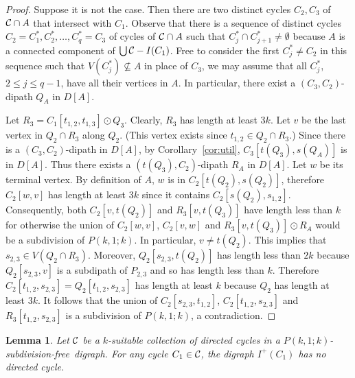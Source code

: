 \documentclass[utf8,10pt]{article}
\theoremstyle{plain}
\newtheorem{lemma}[theorem]{Lemma}
\theoremstyle{definition}
\theoremstyle{remark}
\newcommand{\FH}[1]{{\color{red}{\bf Fred:} #1}}
\newcommand{\free}{subdivision-free}
\begin{document}
\begin{proof}
Suppose it is not the case. Then there are two distinct cycles $C_2, C_3$ of ${\cal C}\cap A$ that intersect with $C_1$.
Observe that there is a sequence of distinct cycles $C_2=C^*_1, C^*_2, \dots , C^*_q=C_3$ of cycles of ${\cal C}\cap A$ such that $C^*_j\cap C^*_{j+1}\neq \emptyset$ because $A$ is a connected component of $\bigcup{\cal C} - I(C_1)$.
Free to consider the first $C^*_j \neq C_2$ in this sequence such that $V(C^*_j)\not\subseteq A$ in place of $C_3$, we may assume
 that all $C^*_j$, $2\leq j\leq q-1$, have all their vertices in $A$.
 In particular, there exist a  $(C_3,C_2)$-dipath $Q_A$ in $D[A]$.

Let $R_3=C_1[t_{1,2},t_{1,3}]\odot Q_3$. Clearly, $R_3$ has length at least $3k$.
Let $v$ be the last vertex in $Q_2\cap R_3$ along $Q_2$. (This vertex exists since $t_{1,2}\in Q_2\cap R_3$.) Since there is a $(C_3,C_2)$-dipath in $D[A]$, by Corollary~\ref{cor:util}, $C_3[t(Q_3), s(Q_A)]$ is in $D[A]$. Thus  there exists a $(t(Q_3), C_2)$-dipath $R_A$ in $D[A]$.  Let $w$ be its terminal vertex. By definition of $A$, $w$ is in $C_2[t(Q_2), s(Q_2)]$, therefore $C_2[w,v]$ has length at least $3k$ since it contains $C_2[s(Q_2), s_{1,2}]$. Consequently, both $C_2[v,t(Q_2)]$ and $R_3[v,t(Q_3)]$ have length less than $k$ for otherwise the union of $C_2[w,v]$, $C_2[v,w]$ and $R_3[v,t(Q_3)]\odot R_A$ would be a subdivision of $P(k,1;k)$.
In particular, $v\neq t(Q_2)$. This implies that $s_{2,3}\in V(Q_2\cap R_3)$.
Moreover, $Q_2[s_{2,3}, t(Q_2)]$ has length less than $2k$ because $Q_2[s_{2,3},v]$ is a subdipath of $P_{2,3}$ and so has length less than $k$.
Therefore $C_2[t_{1,2},s_{2,3}]=Q_2[t_{1,2},s_{2,3}]$ has length at least $k$ because $Q_2$ has length at least $3k$.
It follows that the union of $C_2[s_{2,3},t_{1,2}]$,  $C_2[t_{1,2},s_{2,3}]$ and  $R_3[t_{1,2},s_{2,3}]$ is a subdivision of $P(k,1;k)$, a contradiction.
\end{proof}



\begin{lemma}\label{lem:no-dicycle}
Let ${\cal C}$ be a $k$-suitable collection of directed cycles in a $P(k,1;k)$-\free\ digraph. For any cycle $C_1\in {\cal C}$, the digraph
$I^+(C_1)$ has no directed cycle.  
\end{lemma}
\end{document}
